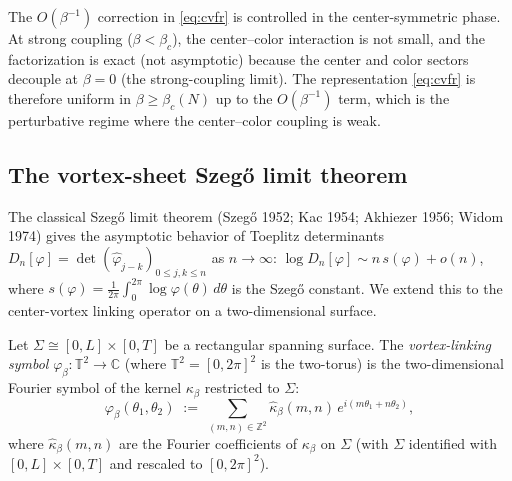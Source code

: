 \begin{remark}
\label{rem:factorization_scope}
The $O(\beta^{-1})$ correction in \eqref{eq:cvfr} is controlled in
the center-symmetric phase. At strong coupling
($\beta<\beta_{c}$), the center--color interaction is not small,
and the factorization is exact (not asymptotic) because the center
and color sectors decouple at $\beta=0$ (the strong-coupling limit).
The representation \eqref{eq:cvfr} is therefore uniform in
$\beta\ge\beta_{c}(N)$ up to the $O(\beta^{-1})$ term, which is the
perturbative regime where the center--color coupling is weak.
\end{remark}

\subsection{The vortex-sheet Szeg\H{o} limit theorem}
\label{ssec:szego}

The classical Szeg\H{o} limit theorem (Szeg\H{o} 1952; Kac 1954;
Akhiezer 1956; Widom 1974) gives the asymptotic behavior of
Toeplitz determinants $D_{n}[\varphi]=\det(\hat{\varphi}_{j-k})
_{0\le j,k\le n}$ as $n\to\infty$:
$\log D_{n}[\varphi]\sim n\,s(\varphi)+o(n)$, where
$s(\varphi)=\frac{1}{2\pi}\int_{0}^{2\pi}\log\varphi(\theta)\,d\theta$
is the Szeg\H{o} constant. We extend this to the
center-vortex linking operator on a two-dimensional surface.

\begin{definition}
\label{def:vortex_symbol}
Let $\Sigma\cong[0,L]\times[0,T]$ be a rectangular spanning
surface. The \emph{vortex-linking symbol}
$\varphi_{\beta}:\mathbb{T}^{2}\to\mathbb{C}$ (where
$\mathbb{T}^{2}=[0,2\pi]^{2}$ is the two-torus) is the
two-dimensional Fourier symbol of the kernel $\kappa_{\beta}$
restricted to $\Sigma$:
\begin{equation}
\label{eq:vortex_symbol}
  \varphi_{\beta}(\theta_{1},\theta_{2})
  \;:=\;\sum_{(m,n)\in\mathbb{Z}^{2}}
  \hat{\kappa}_{\beta}(m,n)\,
  e^{i(m\theta_{1}+n\theta_{2})},
\end{equation}
where $\hat{\kappa}_{\beta}(m,n)$ are the Fourier coefficients of
$\kappa_{\beta}$ on $\Sigma$ (with $\Sigma$ identified with
$[0,L]\times[0,T]$ and rescaled to $[0,2\pi]^{2}$).
\end{definition}

